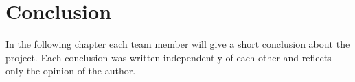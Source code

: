 \chapter{Conclusion}
In the following chapter each team member will give a short conclusion about the project. Each conclusion was written independently of each other and reflects only the opinion of the author.


